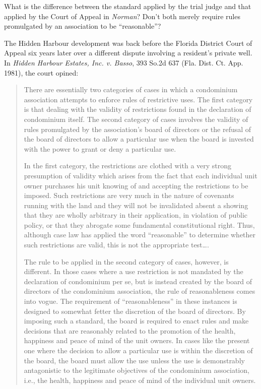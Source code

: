 
\item What is the difference between the standard applied by the trial judge and
that applied by the Court of Appeal in \textit{Norman}? Don't both merely
require rules promulgated by an association to be ``reasonable''?

\item The Hidden Harbour development was back before the Florida District Court
of Appeal six years later over a different dispute involving a resident's
private well. In \emph{Hidden Harbour Estates, Inc. v. Basso}, 393 So.2d 637
(Fla. Dist. Ct. App. 1981), the court opined:
\begin{quotation}
There are essentially two categories of cases in which a condominium association
attempts to enforce rules of restrictive uses. The first category is that
dealing with the validity of restrictions found in the declaration of
condominium itself. The second category of cases involves the validity of rules
promulgated by the association's board of directors or the refusal of the board
of directors to allow a particular use when the board is invested with the power
to grant or deny a particular use.

In the first category, the restrictions are clothed with a very strong
presumption of validity which arises from the fact that each individual unit
owner purchases his unit knowing of and accepting the restrictions to be
imposed. Such restrictions are very much in the nature of covenants running with
the land and they will not be invalidated absent a showing that they are wholly
arbitrary in their application, in violation of public policy, or that they
abrogate some fundamental constitutional right. Thus, although case law has
applied the word ``reasonable'' to determine whether such restrictions are
valid, this is not the appropriate test\ldots.

The rule to be applied in the second category of cases, however, is different.
In those cases where a use restriction is not mandated by the declaration of
condominium per se, but is instead created by the board of directors of the
condominium association, the rule of reasonableness comes into vogue. The
requirement of ``reasonableness'' in these instances is designed to somewhat
fetter the discretion of the board of directors. By imposing such a standard,
the board is required to enact rules and make decisions that are reasonably
related to the promotion of the health, happiness and peace of mind of the unit
owners. In cases like the present one where the decision to allow a particular
use is within the discretion of the board, the board must allow the use unless
the use is demonstrably antagonistic to the legitimate objectives of the
condominium association, i.e., the health, happiness and peace of mind of the
individual unit owners.
\end{quotation}
